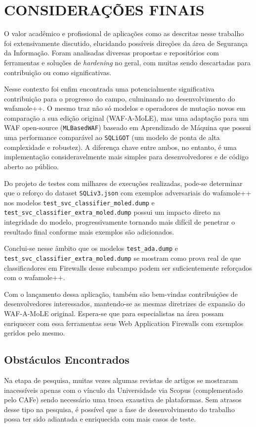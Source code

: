 \chapter{CONSIDERAÇÕES FINAIS}
\label{chp:capitulo6}
O valor acadêmico e profissional de aplicações como as descritas nesse trabalho foi extensivamente discutido, elucidando possíveis direções da área de Segurança da Informação. Foram analisadas diversas propostas e repositórios com ferramentas e soluções de \textit{hardening} no geral, com muitas sendo descartadas para contribuição ou como significativas. 

Nesse contexto foi enfim encontrada uma potencialmente significativa contribuição para o progresso do campo, culminando no desenvolvimento do wafamole++. O mesmo traz não só modelos e operadores de mutação novos em comparação a sua edição original (WAF-A-MoLE), mas uma adaptação para um WAF open-source (\verb+MLBasedWAF+) baseado em Aprendizado de Máquina que possui uma performance comparável ao \verb+SQLiGOT+ (um modelo de ponta de alta complexidade e robustez). A diferença chave entre ambos, no entanto, é uma implementação consideravelmente mais simples para desenvolvedores e de código aberto ao público.

Do projeto de testes com milhares de execuções realizadas, pode-se determinar que o reforço do dataset \verb+SQLiv3.json+ com exemplos adversariais do wafamole++ nos modelos \verb+test_svc_classifier_moled.dump+ e \verb+test_svc_classifier_extra_moled.dump+ possui um impacto direto na integridade do modelo, progressivamente tornando mais difícil de penetrar o resultado final conforme mais exemplos são adicionados.

Conclui-se nesse âmbito que os modelos \verb+test_ada.dump+ e \verb+test_svc_classifier_extra_moled.dump+ se mostram como prova real de que classificadores em Firewalls desse subcampo podem ser suficientemente reforçados com o wafamole++.

Com o lançamento dessa aplicação, também são bem-vindas contribuições de desenvolvedores interessados, mantendo-se as mesmas diretrizes de expansão do WAF-A-MoLE original. Espera-se que para especialistas na área possam enriquecer com essa ferramentas seus Web Application Firewalls com exemplos geridos pelo mesmo.

\section{Obstáculos Encontrados}

Na etapa de pesquisa, muitas vezes algumas revistas de artigos se mostraram inacessíveis apenas com o vínculo da Universidade via Scopus (complementado pelo CAFe) sendo necessário uma troca exaustiva de plataformas. Sem atrasos desse tipo na pesquisa, é possível que a fase de desenvolvimento do trabalho possa ter sido adiantada e enriquecida com mais casos de teste.

